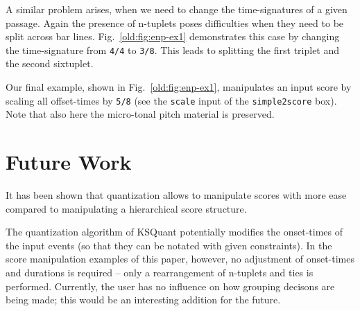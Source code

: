\documentclass[runningheads,a4paper]{llncs}
\begin{document}
A similar problem arises, when we need to change the time-signatures
of a given passage. Again the presence of n-tuplets poses difficulties
when they need to be split across bar lines. Fig.~\ref{old:fig:enp-ex1}
demonstrates this case by changing the time-signature from
\texttt{4/4} to \texttt{3/8}. This leads to splitting the first
triplet and the second sixtuplet.




Our final example, shown in Fig.~\ref{old:fig:enp-ex1}, manipulates an input score by
scaling all offset-times by \texttt{5/8} (see the \texttt{scale} input of the
\texttt{simple2score} box). Note that also here the micro-tonal pitch
material is preserved.


\section{Future Work}
It has been shown that quantization allows to manipulate scores with
more ease compared to manipulating a hierarchical score structure.

The quantization algorithm of KSQuant potentially modifies the
onset-times of the input events (so that they can be notated with
given constraints). In the score manipulation examples of this paper,
however, no adjustment of onset-times and durations is required --
only a rearrangement of n-tuplets and ties is performed. Currently,
the user has no influence on how grouping decisons are being made;
this would be an interesting addition for the future.
\end{document}
